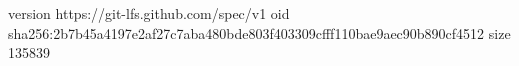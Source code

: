 version https://git-lfs.github.com/spec/v1
oid sha256:2b7b45a4197e2af27c7aba480bde803f403309cfff110bae9aec90b890cf4512
size 135839
